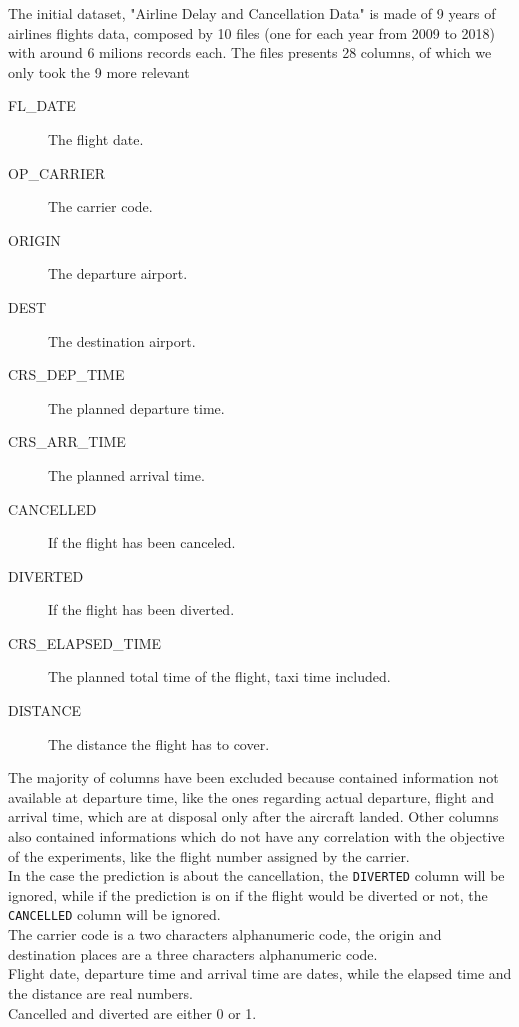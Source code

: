 \documentclass[
	letterpaper, %
	10pt, %
]{class}
\begin{document}
The initial dataset, "Airline Delay and Cancellation Data" \cite{dataset} is made of 9 years of airlines flights data, composed by 10 files (one for each year from 2009 to 2018) with around 6 milions records each.
The files presents 28 columns, of which we only took the 9 more relevant\\

\begin{description}
  \item[FL\_DATE] The flight date.
  \item[OP\_CARRIER] The carrier code.
  \item[ORIGIN] The departure airport.
  \item[DEST] The destination airport.
  \item[CRS\_DEP\_TIME] The planned departure time.
  \item[CRS\_ARR\_TIME] The planned arrival time.
  \item[CANCELLED] If the flight has been canceled.
  \item[DIVERTED] If the flight has been diverted.
  \item[CRS\_ELAPSED\_TIME] The planned total time of the flight, taxi time included.
  \item[DISTANCE] The distance the flight has to cover.\\
\end{description}

The majority of columns have been excluded because contained information not available at departure time, like the ones regarding actual departure, flight and arrival time, which are at disposal only after the aircraft landed.
Other columns also contained informations which do not have any correlation with the objective of the experiments, like the flight number assigned by the carrier.\\

In the case the prediction is about the cancellation, the \texttt{DIVERTED} column will be ignored, while if the prediction is on if the flight would be diverted or not, the \texttt{CANCELLED} column will be ignored.\\

The carrier code is a two characters alphanumeric code, the origin and destination places are a three characters alphanumeric code.\\
Flight date, departure time and arrival time are dates, while the elapsed time and the distance are real numbers.\\
Cancelled and diverted are either 0 or 1.\\
\end{document}
